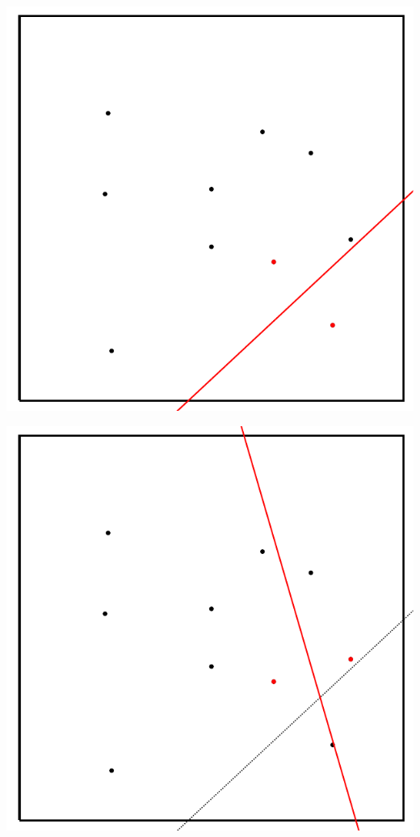 \begin{frame}[fragile]
\begin{overprint}
\begin{center}
\includegraphics[height=0.9\textheight]{fig/voronoi-b1}
\par\end{center}


\begin{center}
\includegraphics[height=0.9\textheight]{fig/voronoi-b2}
\par\end{center}


\end{overprint}
\end{frame}
